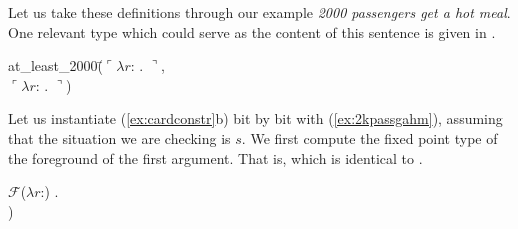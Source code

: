 Let us take these definitions through our example \textit{2000
  passengers get a hot meal}.  One relevant type which could serve as the
content of this sentence is given in \nexteg{}.
\begin{ex}
  \begin{tabbing}
at\_least\_2000(\=$\ulcorner\lambda r$:
                                      . $\urcorner$,\\ 
\>$\ulcorner\lambda
r$: . 
$\urcorner$)
\end{tabbing}
\label{ex:2kpassgahm}
\end{ex} 
Let us instantiate (\ref{ex:cardconstr}b) bit by bit with
(\ref{ex:2kpassgahm}), assuming that the situation we are
checking is $s$.  We first compute the fixed point type of the
foreground of the first argument.  That is,  which is
identical to .

\begin{ex} 
\begin{subex} 
 
\item $\mathcal{F}$($\lambda
                                      r$:)
                                      . \\
\hspace*{5em}) 
 
\item
 
\end{subex} 
   
\end{ex}



